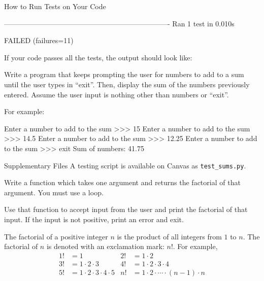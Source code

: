\documentclass[11pt]{cselabheader}
\begin{document}
{\begin{infobox}{How to Run Tests on Your Code}
\begin{bashcode}
----------------------------------------------------------------------
Ran 1 test in 0.010s

FAILED (failures=11)
\end{bashcode}

If your code passes all the tests, the output should look like:

\end{infobox}

\begin{ex}[sums.py] Write a program that keeps prompting the user for numbers to
  add to a sum until the user types in ``exit''. Then, display the sum of the
  numbers previously entered. Assume the user input is nothing other than
  numbers or ``exit''.

  For example:

  \begin{verbatimcode}
Enter a number to add to the sum >>> 15
Enter a number to add to the sum >>> 14.5
Enter a number to add to the sum >>> 12.25
Enter a number to add to the sum >>> exit
Sum of numbers: 41.75
  \end{verbatimcode}
\end{ex}
\begin{infobox}{Supplementary Files}
A testing script is available on Canvas as \texttt{test\_sums.py}.
\end{infobox}

\begin{ex}[factorial.py]
Write a function  which takes one
argument and returns the factorial of that argument.
You must use a  loop.

Use that function to accept input from the user and print the factorial of that input.
If the input is not positive, print an error and exit.

The factorial of a positive integer $n$ is the product of all integers from $1$ to $n$.
The factorial of $n$ is denoted with an exclamation mark: $n!$.
For example,
\begin{align*}
1! &= 1
&
2! &= 1 \cdot 2
\\
3! &= 1 \cdot 2 \cdot 3
&
4! &= 1 \cdot 2 \cdot 3 \cdot 4
\\
5! &= 1 \cdot 2 \cdot 3 \cdot 4 \cdot 5
&
n! &= 1 \cdot 2 \cdot \cdots \cdot (n - 1) \cdot n
\end{align*}


\end{ex}}
\end{document}
